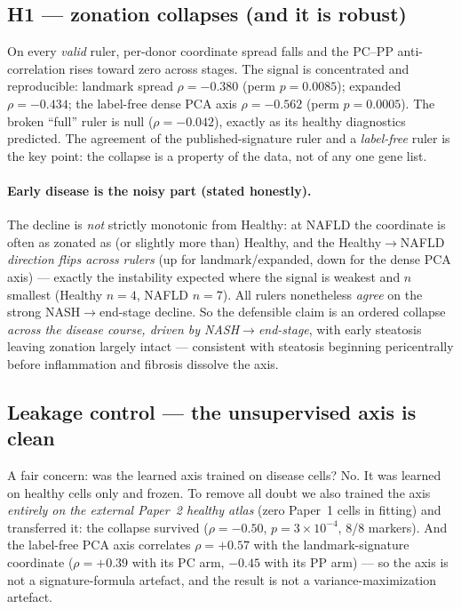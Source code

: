 \documentclass[11pt]{article}
\begin{document}
\subsection{H1 --- zonation collapses (and it is robust)}
On every \emph{valid} ruler, per-donor coordinate spread falls and the PC--PP anti-correlation
rises toward zero across stages. The signal is concentrated and reproducible:
landmark spread $\rho=-0.380$ (perm $p=0.0085$); expanded $\rho=-0.434$; the label-free dense
PCA axis $\rho=-0.562$ (perm $p=0.0005$). The broken ``full'' ruler is null ($\rho=-0.042$),
exactly as its healthy diagnostics predicted. The agreement of the published-signature ruler and a
\emph{label-free} ruler is the key point: the collapse is a property of the data, not of any one
gene list.

\paragraph{Early disease is the noisy part (stated honestly).} The decline is \emph{not} strictly
monotonic from Healthy: at NAFLD the coordinate is often as zonated as (or slightly more than)
Healthy, and the Healthy$\to$NAFLD \emph{direction flips across rulers} (up for landmark/expanded,
down for the dense PCA axis) --- exactly the instability expected where the signal is weakest and $n$
smallest (Healthy $n=4$, NAFLD $n=7$). All rulers nonetheless \emph{agree} on the strong
NASH$\to$end-stage decline. So the defensible claim is an ordered collapse \emph{across the disease
course, driven by NASH$\to$end-stage}, with early steatosis leaving zonation largely intact ---
consistent with steatosis beginning pericentrally before inflammation and fibrosis dissolve the axis.

\subsection{Leakage control --- the unsupervised axis is clean}
A fair concern: was the learned axis trained on disease cells? No. It was learned on healthy cells
only and frozen. To remove all doubt we also trained the axis \emph{entirely on the external
Paper~2 healthy atlas} (zero Paper~1 cells in fitting) and transferred it: the collapse survived
($\rho=-0.50$, $p=3\times10^{-4}$, 8/8 markers). And the label-free PCA axis correlates $\rho=+0.57$ with the landmark-signature coordinate ($\rho=+0.39$ with its PC arm, $-0.45$ with its PP arm) --- so the axis is not a
signature-formula artefact, and the result is not a variance-maximization artefact.
\end{document}

